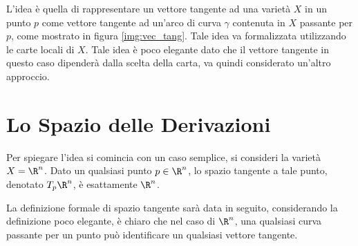 \documentclass[10pt, letterpaper]{report}
\begin{document}
L'idea è quella di rappresentare un vettore tangente ad una varietà $X$ in un punto $p$ come vettore tangente ad un'arco di curva $\gamma$ contenuta in $X$ passante per $p$, come mostrato in figura \ref{img:vec_tang}. Tale idea va formalizzata utilizzando le carte locali di $X$. Tale idea è poco elegante dato che il vettore tangente in questo caso dipenderà dalla scelta della carta, va quindi considerato un'altro approccio.\section{Lo Spazio delle Derivazioni}
Per spiegare l'idea si comincia con un caso semplice, si consideri la varietà $X=\R^n$. Dato un qualsiasi punto $p\in\R^n$, lo spazio tangente a tale punto, denotato $T_p\R^n$, è esattamente $\R^n$.\bigskip

La definizione formale di spazio tangente sarà data in seguito, considerando la definizione poco elegante, è chiaro che nel caso di $\R^n$, una qualsiasi curva passante per un punto può identificare un qualsiasi vettore tangente.
\bigskip
\end{document}

